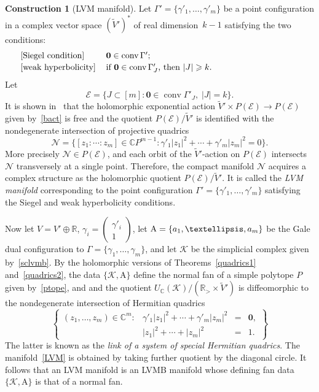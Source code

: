 \documentclass[a4paper]{amsart}
\theoremstyle{definition}
\newtheorem{construction}[theorem]{Construction}
\theoremstyle{remark}
\numberwithin{equation}{section}
\def\R{\mathbb R}
\def\C{\mathbb C}
\def\R{\mathbb R}
\def\sK{\mathcal K}
\newcommand{\mb}[1]{{\textbf {\textit#1}}}
\renewcommand{\ge}{\geqslant}
\def\conv{\mathop{\mathrm{conv}}}
\newcommand{\<}{\langle}
\renewcommand{\>}{\rangle}
\begin{document}
\begin{construction}[LVM manifold]
Let $\Gamma'=\{\gamma'_1,\ldots,\gamma'_m\}$ be a point configuration in a complex vector space $(\widetilde V')^*$ of real dimension~$k-1$ satisfying the two conditions:
\[
\begin{tabular}{l p{0.65\textwidth}}
[\emph{Siegel condition}]& $\mathbf{0}\in\conv\Gamma'$;\\[2pt]

[\emph{weak hyperbolicity}]& if $\mathbf{0}\in\conv\Gamma'_J$, then $|J|\ge k$.
\end{tabular}
\]
Let
\[
  \mathcal E=\{J\subset[m]\colon \mathbf{0}\in\conv\Gamma'_J,\; |J|=k\}.
\]
It is shown in~\cite{meer00} that the holomorphic exponential action $\widetilde V'\times P(\mathcal E)\to P(\mathcal E)$ given by~\eqref{bact} is free and the quotient $P(\mathcal E)/\widetilde V'$ is identified with the nondegenerate intersection of projective quadrics
\begin{equation}\label{LVM}
  \mathcal N=\bigl\{[z_1\colon\cdots\colon z_m]\in\C P^{m-1}\colon
  \gamma'_1|z_1|^2+\cdots+\gamma'_m|z_m|^2=0\bigr\}.
\end{equation}
More precisely $\mathcal N\in P(\mathcal E)$, and each orbit of the $\widetilde V'$-action on $P(\mathcal E)$ intersects $\mathcal N$ transversely at a single point. Therefore, the compact manifold $\mathcal N$ acquires a complex structure as the holomorphic quotient $P(\mathcal E)/\widetilde V'$. It is called the \emph{LVM manifold} corresponding to the point configuration $\Gamma'=\{\gamma'_1,\ldots,\gamma'_m\}$ satisfying the Siegel and weak hyperbolicity conditions.
\end{construction}

Now let $V=V'\oplus\R$, $\gamma_i=\begin{pmatrix}\gamma'_i\\1\end{pmatrix}$, let $\mathrm A=\{\mb a_1,\ldots,\mb a_m\}$ be the Gale dual configuration to $\Gamma=\{\gamma_1,\ldots,\gamma_m\}$, and let $\sK$ be the simplicial complex given by~\eqref{sclvmb}. By the holomorphic versions of Theorems~\ref{quadrics1} and~\ref{quadrics2}, the data $\{\mathcal K,\mathrm A\}$ define the normal fan of a simple polytope $P$ given by~\eqref{ptope}, and and the quotient $U_\C(\sK)/(\R_>\times\widetilde V')$ is diffeomorphic to the nondegenerate intersection of Hermitian quadrics
\begin{equation}\label{Hlink}
  \left\{\begin{array}{lrcl}
  (z_1,\ldots,z_m)\in\C^m\colon&
  \gamma'_1|z_1|^2+\cdots+\gamma'_m|z_m|^2&=&\mathbf{0},\\[1mm]
  &|z_1|^2+\cdots+|z_m|^2&=&1.
  \end{array}\right\}
\end{equation}
The latter is known as the \emph{link of a system of special Hermitian quadrics}. The manifold~\eqref{LVM} is obtained by taking further quotient by the diagonal circle. It follows that an LVM manifold is an LVMB manifold whose defining fan data $\{\sK,\mathrm A\}$ is that of a normal fan.
\end{document}
